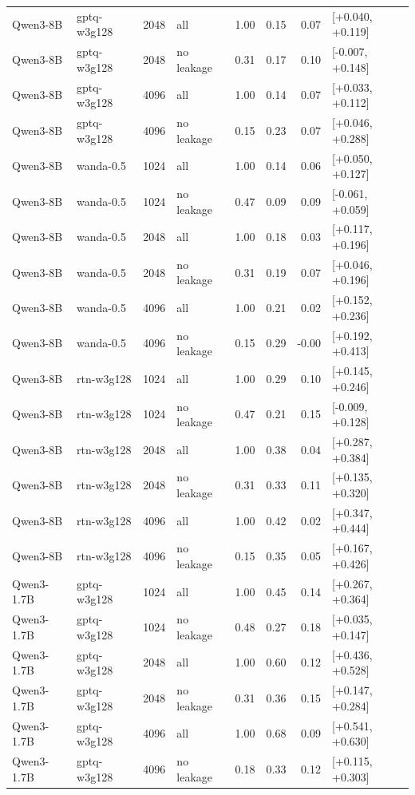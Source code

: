 \begin{tabular}{llrlrrrl}
Qwen3-8B & gptq-w3g128 & 2048 & all & 1.00 & 0.15 & 0.07 & [+0.040, +0.119] \\
Qwen3-8B & gptq-w3g128 & 2048 & no leakage & 0.31 & 0.17 & 0.10 & [-0.007, +0.148] \\
Qwen3-8B & gptq-w3g128 & 4096 & all & 1.00 & 0.14 & 0.07 & [+0.033, +0.112] \\
Qwen3-8B & gptq-w3g128 & 4096 & no leakage & 0.15 & 0.23 & 0.07 & [+0.046, +0.288] \\
Qwen3-8B & wanda-0.5 & 1024 & all & 1.00 & 0.14 & 0.06 & [+0.050, +0.127] \\
Qwen3-8B & wanda-0.5 & 1024 & no leakage & 0.47 & 0.09 & 0.09 & [-0.061, +0.059] \\
Qwen3-8B & wanda-0.5 & 2048 & all & 1.00 & 0.18 & 0.03 & [+0.117, +0.196] \\
Qwen3-8B & wanda-0.5 & 2048 & no leakage & 0.31 & 0.19 & 0.07 & [+0.046, +0.196] \\
Qwen3-8B & wanda-0.5 & 4096 & all & 1.00 & 0.21 & 0.02 & [+0.152, +0.236] \\
Qwen3-8B & wanda-0.5 & 4096 & no leakage & 0.15 & 0.29 & -0.00 & [+0.192, +0.413] \\
Qwen3-8B & rtn-w3g128 & 1024 & all & 1.00 & 0.29 & 0.10 & [+0.145, +0.246] \\
Qwen3-8B & rtn-w3g128 & 1024 & no leakage & 0.47 & 0.21 & 0.15 & [-0.009, +0.128] \\
Qwen3-8B & rtn-w3g128 & 2048 & all & 1.00 & 0.38 & 0.04 & [+0.287, +0.384] \\
Qwen3-8B & rtn-w3g128 & 2048 & no leakage & 0.31 & 0.33 & 0.11 & [+0.135, +0.320] \\
Qwen3-8B & rtn-w3g128 & 4096 & all & 1.00 & 0.42 & 0.02 & [+0.347, +0.444] \\
Qwen3-8B & rtn-w3g128 & 4096 & no leakage & 0.15 & 0.35 & 0.05 & [+0.167, +0.426] \\
Qwen3-1.7B & gptq-w3g128 & 1024 & all & 1.00 & 0.45 & 0.14 & [+0.267, +0.364] \\
Qwen3-1.7B & gptq-w3g128 & 1024 & no leakage & 0.48 & 0.27 & 0.18 & [+0.035, +0.147] \\
Qwen3-1.7B & gptq-w3g128 & 2048 & all & 1.00 & 0.60 & 0.12 & [+0.436, +0.528] \\
Qwen3-1.7B & gptq-w3g128 & 2048 & no leakage & 0.31 & 0.36 & 0.15 & [+0.147, +0.284] \\
Qwen3-1.7B & gptq-w3g128 & 4096 & all & 1.00 & 0.68 & 0.09 & [+0.541, +0.630] \\
Qwen3-1.7B & gptq-w3g128 & 4096 & no leakage & 0.18 & 0.33 & 0.12 & [+0.115, +0.303] \\

\end{tabular}
